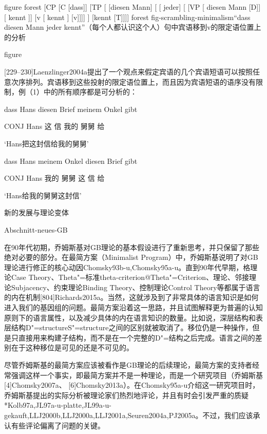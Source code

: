 figure
forest
[CP
    [C
      [dass]]
    [TP
        [
          [diesen Mann]
          [
            [ jeder]
            [
                [VP
                  [ diesen Mann  [D]] 
                  [ kennt ]]
                [v
                  [ kennt ]
                  [v]]]] ]
        [kennt [T]]]]
forest
fig-scrambling-minimalism“dass diesen Mann jeder kennt”（每个人都认识这个人）句中宾语移到v的限定语位置上的分析


figure

[229--230]Laenzlinger2004a提出了一个观点来假定宾语的几个宾语短语可以按照任意次序排列。宾语移到这些投射的限定语位置上，而且因为宾语短语的语序没有限制，例（1）中的所有顺序都是可分析的：






dass Hans diesen Brief meinem Onkel gibt

     CONJ Hans 这 信 我的 舅舅 给

`Hans把这封信给我的舅舅'



dass Hans meinem Onkel diesen Brief gibt

     CONJ Hans 我的 舅舅 这 信 给

`Hans给我的舅舅这封信'





新的发展与理论变体

Abschnitt-neues-GB

在90年代初期，乔姆斯基对GB理论的基本假设进行了重新思考，并只保留了那些绝对必要的部分。在最简方案（Minimalist Program）中，乔姆斯基说明了对GB理论进行修正的核心动因Chomsky93b-u,Chomsky95a-u。直到90年代早期，格理论Case Theory、Theta"=标准theta-criterion@Theta"=Criterion、理论、邻接理论Subjacency、约束理论Binding Theory、控制理论Control Theory等都属于语言的内在机制[804]Richards2015a。当然，这就涉及到了非常具体的语言知识是如何进入我们的基因组的问题。最简方案沿着这一思路，并且试图解释更为普遍的认知原则下的语言属性，以及减少具体的内在语言知识的数量。比如说，深层结构和表层结构D"=structureS"=structure之间的区别就被取消了。移位仍是一种操作，但是只直接用来构建子结构，而不是在一个完整的D"=结构之后完成。语言之间的差别在于这种移位是可见的还是不可见的。












尽管乔姆斯基的最简方案应该被看作是GB理论的后续理论，最简方案的支持者经常强调这样一个事实，即最简方案并不是一种理论，而是一个研究项目（乔姆斯基[4]Chomsky2007a、
[6]Chomsky2013a）。在Chomsky95a-u介绍这一研究项目时，乔姆斯基提出的实际分析被理论家们热烈地评论，并且有时会引发严重的质疑*Kolb97a,JL97a-u-platte,JL99a-u-gekauft,LLJ2000b,LLJ2000a,LLJ2001a,Seuren2004a,PJ2005a。不过，我们应该承认有些评论偏离了问题的关键。






